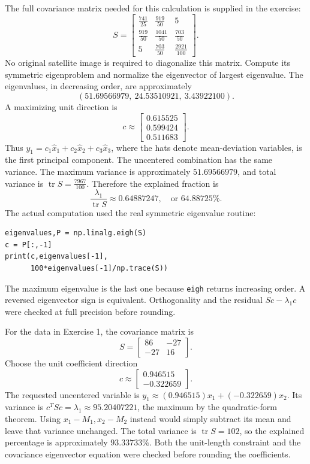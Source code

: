 The full covariance matrix needed for this calculation is supplied in the exercise:
\[S=\begin{bmatrix}\frac{741}{25}&\frac{919}{50}&5\\\frac{919}{50}&\frac{1041}{50}&\frac{703}{50}\\5&\frac{703}{50}&\frac{2921}{100}\end{bmatrix}.\]
No original satellite image is required to diagonalize this matrix. Compute its symmetric eigenproblem and normalize the eigenvector of largest eigenvalue. The eigenvalues, in decreasing order, are approximately
\[(51.69566979,\ 24.53510921,\ 3.43922100).\]
A maximizing unit direction is
\[c\approx\begin{bmatrix}0.615525\\0.599424\\0.511683\end{bmatrix}.\]
Thus $y_1=c_1\widehat x_1+c_2\widehat x_2+c_3\widehat x_3$, where the hats denote mean-deviation variables, is the first principal component. The uncentered combination has the same variance. The maximum variance is approximately $51.69566979$, and total variance is $\operatorname{tr}S=\frac{7967}{100}$. Therefore the explained fraction is
\[\frac{\lambda_1}{\operatorname{tr}S}\approx 0.64887247,\quad\text{or }64.88725\%.\]
The actual computation used the real symmetric eigenvalue routine:
\begin{verbatim}
eigenvalues,P = np.linalg.eigh(S)
c = P[:,-1]
print(c,eigenvalues[-1],
      100*eigenvalues[-1]/np.trace(S))
\end{verbatim}
The maximum eigenvalue is the last one because \texttt{eigh} returns increasing order. A reversed eigenvector sign is equivalent. Orthogonality and the residual $Sc-\lambda_1c$ were checked at full precision before rounding.

For the data in Exercise 1, the covariance matrix is
\[S=\begin{bmatrix}86&-27\\-27&16\end{bmatrix}.\]
Choose the unit coefficient direction
\[c\approx\begin{bmatrix}0.946515\\-0.322659\end{bmatrix}.\]
The requested uncentered variable is $y_1\approx (0.946515)x_1+(-0.322659)x_2$. Its variance is $c^TSc=\lambda_1\approx 95.20407221$, the maximum by the quadratic-form theorem. Using $x_1-M_1,x_2-M_2$ instead would simply subtract its mean and leave that variance unchanged.
The total variance is $\operatorname{tr}S=102$, so the explained percentage is approximately $93.33733\%$. Both the unit-length constraint and the covariance eigenvector equation were checked before rounding the coefficients.

